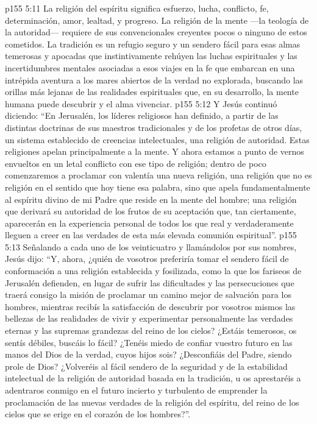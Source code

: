 \vs p155 5:11 La religión del espíritu significa esfuerzo, lucha, conflicto, fe, determinación, amor, lealtad, y progreso. La religión de la mente ---la teología de la autoridad--- requiere de sus convencionales creyentes pocos o ninguno de estos cometidos. La tradición es un refugio seguro y un sendero fácil para esas almas temerosas y apocadas que instintivamente rehúyen las luchas espirituales y las incertidumbres mentales asociadas a esos viajes en la fe que embarcan en una intrépida aventura a los mares abiertos de la verdad no explorada, buscando las orillas más lejanas de las realidades espirituales que, en su desarrollo, la mente humana puede descubrir y el alma vivenciar.
\vs p155 5:12 \pc Y Jesús continuó diciendo: “En Jerusalén, los líderes religiosos han definido, a partir de las distintas doctrinas de sus maestros tradicionales y de los profetas de otros días, un sistema establecido de creencias intelectuales, una religión de autoridad. Estas religiones apelan principalmente a la mente. Y ahora estamos a punto de vernos envueltos en un letal conflicto con ese tipo de religión; dentro de poco comenzaremos a proclamar con valentía una nueva religión, una religión que no es religión en el sentido que hoy tiene esa palabra, sino que apela fundamentalmente al espíritu divino de mi Padre que reside en la mente del hombre; una religión que derivará su autoridad de los frutos de su aceptación que, tan ciertamente, aparecerán en la experiencia personal de todos los que real y verdaderamente lleguen a creer en las verdades de esta más elevada comunión espiritual”.
\vs p155 5:13 Señalando a cada uno de los veinticuatro y llamándolos por sus nombres, Jesús dijo: “Y, ahora, ¿quién de vosotros preferiría tomar el sendero fácil de conformación a una religión establecida y fosilizada, como la que los fariseos de Jerusalén defienden, en lugar de sufrir las dificultades y las persecuciones que traerá consigo la misión de proclamar un camino mejor de salvación para los hombres, mientras recibís la satisfacción de descubrir por vosotros mismos las bellezas de las realidades de vivir y experimentar personalmente las verdades eternas y las supremas grandezas del reino de los cielos? ¿Estáis temerosos, os sentís débiles, buscáis lo fácil? ¿Tenéis miedo de confiar vuestro futuro en las manos del Dios de la verdad, cuyos hijos sois? ¿Desconfiáis del Padre, siendo prole de Dios? ¿Volveréis al fácil sendero de la seguridad y de la estabilidad intelectual de la religión de autoridad basada en la tradición, u os aprestaréis a adentraros conmigo en el futuro incierto y turbulento de emprender la proclamación de las nuevas verdades de la religión del espíritu, del reino de los cielos que se erige en el corazón de los hombres?”.
